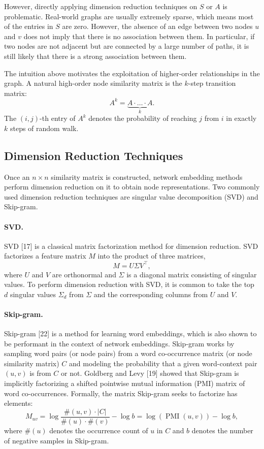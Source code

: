 \documentclass[11pt]{article}
\begin{document}
However, directly applying dimension reduction techniques on $S$ or $A$ is problematic. Real-world graphs are usually extremely sparse, which means most of the entries in $S$ are zero. However, the absence of an edge between two nodes $u$ and $v$ does not imply that there is no association between them. In particular, if two nodes are not adjacent but are connected by a large number of paths, it is still likely that there is a strong association between them.

The intuition above motivates the exploitation of higher-order relationships in the graph. A natural high-order node similarity matrix is the $k$-step transition matrix:
\begin{equation}
A^k = \underbrace{A \cdot \ldots \cdot A}_{k}.
\end{equation}
The $(i,j)$-th entry of $A^k$ denotes the probability of reaching $j$ from $i$ in exactly $k$ steps of random walk.

\subsection{Dimension Reduction Techniques}

Once an $n \times n$ similarity matrix is constructed, network embedding methods perform dimension reduction on it to obtain node representations. Two commonly used dimension reduction techniques are singular value decomposition (SVD) and Skip-gram.

\paragraph{SVD.}
SVD [17] is a classical matrix factorization method for dimension reduction. SVD factorizes a feature matrix $M$ into the product of three matrices,
\[
M = U \Sigma V^\top,
\]
where $U$ and $V$ are orthonormal and $\Sigma$ is a diagonal matrix consisting of singular values. To perform dimension reduction with SVD, it is common to take the top $d$ singular values $\Sigma_d$ from $\Sigma$ and the corresponding columns from $U$ and $V$.

\paragraph{Skip-gram.}
Skip-gram [22] is a method for learning word embeddings, which is also shown to be performant in the context of network embeddings. Skip-gram works by sampling word pairs (or node pairs) from a word co-occurrence matrix (or node similarity matrix) $C$ and modeling the probability that a given word-context pair $(u,v)$ is from $C$ or not. Goldberg and Levy [19] showed that Skip-gram is implicitly factorizing a shifted pointwise mutual information (PMI) matrix of word co-occurrences. Formally, the matrix Skip-gram seeks to factorize has elements:
\begin{equation}
M_{uv} = \log \frac{\#(u,v) \cdot |C|}{\#(u) \cdot \#(v)} - \log b = \log(\operatorname{PMI}(u,v)) - \log b,
\end{equation}
where $\#(u)$ denotes the occurrence count of $u$ in $C$ and $b$ denotes the number of negative samples in Skip-gram.
\end{document}
